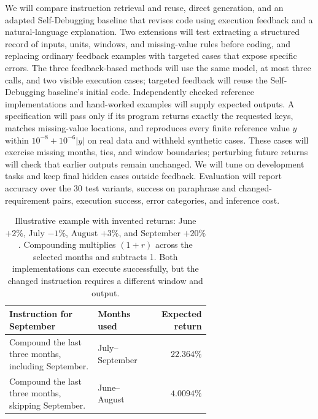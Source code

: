 \documentclass{article}
\begin{document}
We will compare instruction retrieval and reuse, direct
generation, and an adapted Self-Debugging baseline
\citep{chen2024selfdebug} that revises code using execution
feedback and a natural-language explanation. Two extensions will
test extracting a structured record of inputs, units, windows,
and missing-value rules before coding, and replacing ordinary
feedback examples with targeted cases that expose specific errors.
The three feedback-based methods will use the same model,
at most three calls, and two visible execution cases; targeted
feedback will reuse the Self-Debugging baseline's initial code.
Independently checked reference implementations and hand-worked
examples will supply expected outputs. A specification will pass
only if its program returns exactly the requested keys, matches
missing-value locations, and reproduces every finite reference
value $y$ within $10^{-8}+10^{-6}|y|$ on real data and withheld
synthetic cases. These cases will exercise missing months, ties,
and window boundaries; perturbing future returns will check that
earlier outputs remain unchanged. We will tune on development
tasks and keep final hidden cases outside feedback. Evaluation
will report accuracy over the 30 test variants, success on
paraphrase and changed-requirement pairs, execution success,
error categories, and inference cost.

\begin{table}[ht]
\centering
\small
\renewcommand{\arraystretch}{1.15}
\begin{tabular}{
  @{}
  >{\raggedright\arraybackslash}p{0.44\linewidth}
  >{\raggedright\arraybackslash}p{0.21\linewidth}
  r
  @{}
}
\toprule
\textbf{Instruction for September}
& \textbf{Months used}
& \textbf{Expected return} \\
\midrule
Compound the last three months, including September.
& July--September
& $22.364\%$ \\
Compound the last three months, skipping September.
& June--August
& $4.0094\%$ \\
\bottomrule
\end{tabular}
\caption{
Illustrative example with invented returns:
June $+2\%$, July $-1\%$, August $+3\%$, and September $+20\%$.
Compounding multiplies $(1+r)$ across the selected months and
subtracts 1. Both implementations can execute successfully,
but the changed instruction requires a different window and output.
}
\label{tab:example}
\end{table}



\end{document}
